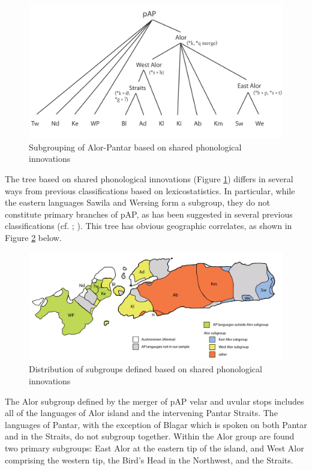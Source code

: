 \begin{figure} 
\includegraphics[width=\textwidth]{figures/holton_ch2_fig1.png}

\caption{Subgrouping of Alor-Pantar based on shared phonological innovations}
\label{fig:2:1}
\end{figure}

The tree based on shared phonological innovations (Figure \ref{fig:2:1}) differs in several ways from previous classifications based on lexicostatistics. In particular, while the eastern languages Sawila and Wersing form a subgroup, they do not constitute primary branches of pAP, as has been suggested in several previous classifications (cf. \citealt{Wurm1982}; \citealt{Lewis2009}). This tree has obvious geographic correlates, as shown in Figure \ref{fig:2:2} below. 

\begin{figure}
\includegraphics[width=\textwidth]{figures/holton_ch2_fig2.pdf}
\caption{Distribution of subgroups defined based on shared phonological innovations}
\label{fig:2:2}
\end{figure}

The Alor subgroup defined by the merger of pAP velar and uvular stops includes all of the languages of Alor island and the intervening Pantar Straits. The languages of Pantar, with the exception of Blagar which is spoken on both Pantar and in the Straits, do not subgroup together. Within the Alor group are found two primary subgroups: East Alor at the eastern tip of the island, and West Alor comprising the western tip, the Bird's Head in the Northwest, and the Straits.

